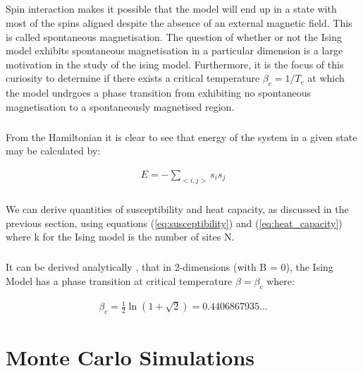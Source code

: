 \documentclass[12pt] {report} %
\begin{document}
			\paragraph{}
				Spin interaction makes it possible that the model will end up in a state with most of the spins aligned despite the absence of an external magnetic field. This is called spontaneous magnetisation. The question of whether or not the Ising model exhibits spontaneous magnetisation in a particular dimension is a large motivation in the study of the ising model. Furthermore, it is the focus of this curiosity to determine if there exists a critical temperature $\beta_c = 1/T_c$ at which the model undrgoes a phase transition from exhibiting no spontaneous magnetisation to a spontaneously magnetised region.
				
			\paragraph{}
				From the Hamiltonian it is clear to see that energy of the system in a given state may be calculated by:
				
			\begin{align}
				E =	 -\sum_{<i, j>}s_i s_j 	\label{eq:energy}
			\end{align}
			
			\paragraph{}
				We can derive quantities of susceptibility and heat capacity, as discussed in the previous section, using equations (\ref{eq:susceptibility}) and (\ref{eq:heat_capacity}) where k for the Ising model is the number of sites N.
				
			\paragraph{}
				It can be derived analytically \cite{anagnostopoulos}, \cite{statisticalmechanics} that in 2-dimensions (with B = 0), the Ising Model has a phase transition at critical temperature $\beta = \beta_c$ where:
				
			\begin{align}
				\beta_c = \frac{1}{2}\ln(1 + \sqrt{2}) = 0.4406867935... \label{critical_temperature}
			\end{align}
			
			
	\chapter{Monte Carlo Simulations} \label{chapter:monte carlo simulations}
	
\end{document}
